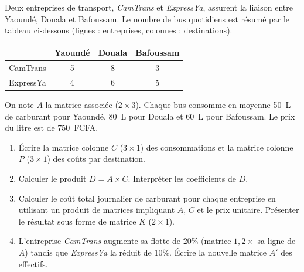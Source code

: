 \documentclass[11pt]{article}
\begin{document}
\begin{exercice}
Deux entreprises de transport, \textit{CamTrans} et \textit{ExpressYa}, assurent la liaison entre Yaoundé, Douala et Bafoussam. 
Le nombre de bus quotidiens est résumé par le tableau ci-dessous (lignes : entreprises, colonnes : destinations).

\begin{center}
\begin{tabular}{|c|c|c|c|}
\hline
 & Yaoundé & Douala & Bafoussam \\ \hline
CamTrans & 5 & 8 & 3 \\ \hline
ExpressYa & 4 & 6 & 5 \\ \hline
\end{tabular}
\end{center}

On note $A$ la matrice associée ($2 \times 3$). Chaque bus consomme en moyenne \SI{50}{L} de carburant pour Yaoundé, \SI{80}{L} pour Douala et \SI{60}{L} pour Bafoussam. Le prix du litre est de \SI{750}{FCFA}.
\begin{enumerate}
    \item Écrire la matrice colonne $C$ ($3 \times 1$) des consommations et la matrice colonne $P$ ($3 \times 1$) des coûts par destination.
    \item Calculer le produit $D = A \times C$. Interpréter les coefficients de $D$.
    \item Calculer le coût total journalier de carburant pour chaque entreprise en utilisant un produit de matrices impliquant $A$, $C$ et le prix unitaire. Présenter le résultat sous forme de matrice $K$ ($2 \times 1$).
    \item L'entreprise \textit{CamTrans} augmente sa flotte de $20\%$ (matrice $1,2 \times$ sa ligne de $A$) tandis que \textit{ExpressYa} la réduit de $10\%$. Écrire la nouvelle matrice $A'$ des effectifs.
\end{enumerate}
\end{exercice}
\end{document}
